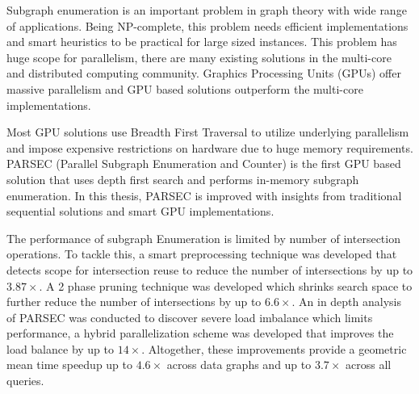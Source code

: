 Subgraph enumeration is an important problem in graph theory with wide range of applications.
Being NP-complete, this problem needs efficient implementations and smart heuristics to be practical for large sized instances.
This problem has huge scope for parallelism, there are many existing solutions in the multi-core and distributed computing community.
Graphics Processing Units (GPUs) offer massive parallelism and GPU based solutions outperform the multi-core implementations.

Most GPU solutions use Breadth First Traversal to utilize underlying parallelism and impose expensive restrictions on hardware due to huge memory requirements.
PARSEC (Parallel Subgraph Enumeration and Counter) \cite{PARSEC_VD} is the first GPU based solution that uses depth first search and performs in-memory subgraph enumeration.
In this thesis, PARSEC is improved with insights from traditional sequential solutions and smart GPU implementations.

The performance of subgraph Enumeration is limited by number of intersection operations. To tackle this, a smart preprocessing technique was developed that detects scope for intersection reuse to reduce the number of intersections by up to $3.87\times$.
A 2 phase pruning technique was developed which shrinks search space to further reduce the number of intersections by up to $6.6\times$.
An in depth analysis of PARSEC was conducted to discover severe load imbalance which limits performance, a hybrid parallelization scheme was developed that improves the load balance by up to $14\times$.
Altogether, these improvements provide a geometric mean time speedup up to $4.6\times$ across data graphs and up to $3.7\times$ across all queries.
